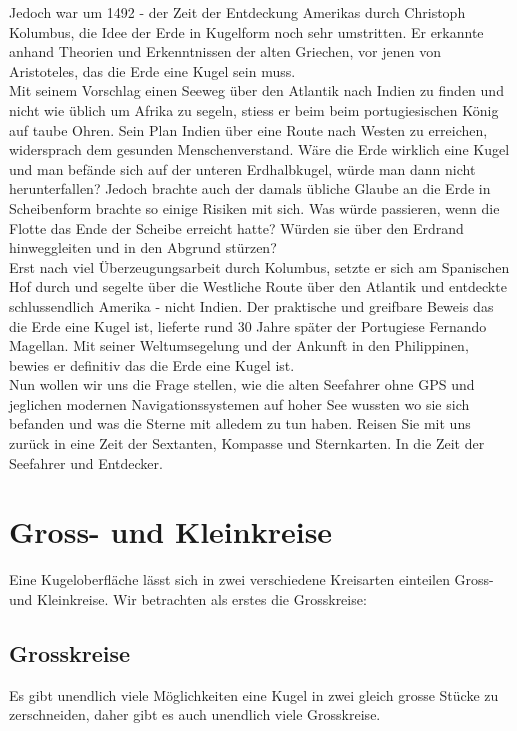 \begin{refsection}
Jedoch war um 1492 - der Zeit der Entdeckung Amerikas durch Christoph Kolumbus, die Idee der Erde in Kugelform noch sehr umstritten. Er erkannte anhand Theorien und Erkenntnissen der alten Griechen, vor jenen von Aristoteles, das die Erde eine Kugel sein muss. \\
Mit seinem Vorschlag einen Seeweg über den Atlantik nach Indien zu finden und nicht wie üblich um Afrika zu segeln, stiess er beim beim portugiesischen König auf taube Ohren. Sein Plan Indien über eine Route nach Westen zu erreichen, widersprach dem gesunden Menschenverstand. Wäre die Erde wirklich eine Kugel und man befände sich auf der unteren Erdhalbkugel, würde man dann nicht herunterfallen? Jedoch brachte auch der damals übliche Glaube an die Erde in Scheibenform brachte so einige Risiken mit sich. Was würde passieren, wenn die Flotte das Ende der Scheibe erreicht hatte? Würden sie über den Erdrand hinweggleiten und in den Abgrund stürzen?\\
Erst nach viel Überzeugungsarbeit durch Kolumbus, setzte er sich am Spanischen Hof durch und segelte über die Westliche Route über den Atlantik und entdeckte schlussendlich Amerika - nicht Indien.
Der praktische und greifbare Beweis das die Erde eine Kugel ist, lieferte rund 30 Jahre später der Portugiese Fernando Magellan. Mit seiner Weltumsegelung und der Ankunft in den Philippinen, bewies er definitiv das die Erde eine Kugel ist.\\

Nun wollen wir uns die Frage stellen, wie die alten Seefahrer ohne GPS und jeglichen modernen Navigationssystemen auf hoher See wussten wo sie sich befanden und was die Sterne mit alledem zu tun haben. Reisen Sie mit uns zurück in eine Zeit der Sextanten, Kompasse und Sternkarten. In die Zeit der Seefahrer und Entdecker.



\section{Gross- und Kleinkreise}
Eine Kugeloberfläche lässt sich in zwei verschiedene Kreisarten einteilen  Gross- und Kleinkreise. 
Wir betrachten als erstes die Grosskreise:


\subsection{Grosskreise}
Es gibt unendlich viele Möglichkeiten eine Kugel in zwei gleich grosse Stücke zu zerschneiden, daher gibt es auch unendlich viele Grosskreise.


\end{refsection}
